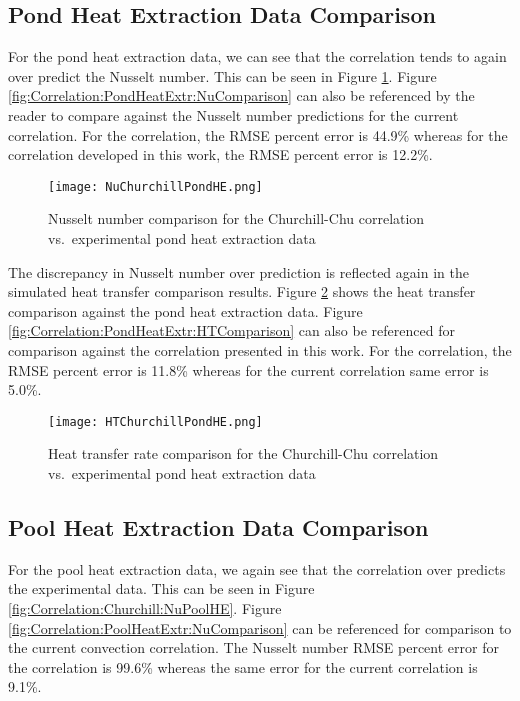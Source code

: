 \subsection{Pond Heat Extraction Data Comparison}
\label{Correlation:Churchill:PondHE}

For the pond heat extraction data, we can see that the \cite{ChurchillChu1975} correlation tends to again over predict the Nusselt number. This can be seen in Figure \ref{fig:Correlation:Churchill:NuPondHE}. Figure \ref{fig:Correlation:PondHeatExtr:NuComparison} can also be referenced by the reader to compare against the Nusselt number predictions for the current correlation. For the \cite{ChurchillChu1975} correlation, the RMSE percent error is 44.9\% whereas for the correlation developed in this work, the RMSE percent error is 12.2\%.

\begin{figure}
	\centering
	\texttt{[image: NuChurchillPondHE.png]}
	\caption{Nusselt number comparison for the Churchill-Chu correlation vs.\ experimental pond heat extraction data}
	\label{fig:Correlation:Churchill:NuPondHE}
\end{figure}

The discrepancy in Nusselt number over prediction is reflected again in the simulated heat transfer comparison results. Figure \ref{fig:Correlation:Churchill:HTPondHE} shows the heat transfer comparison against the pond heat extraction data. Figure \ref{fig:Correlation:PondHeatExtr:HTComparison} can also be referenced for comparison against the correlation presented in this work. For the \cite{ChurchillChu1975} correlation, the RMSE percent error is 11.8\% whereas for the current correlation same error is 5.0\%.

\begin{figure}
	\centering
	\texttt{[image: HTChurchillPondHE.png]}
	\caption{Heat transfer rate comparison for the Churchill-Chu correlation vs.\ experimental pond heat extraction data}
	\label{fig:Correlation:Churchill:HTPondHE}
\end{figure}

\subsection{Pool Heat Extraction Data Comparison}
\label{Correlation:Churchill:PoolHE}

For the pool heat extraction data, we again see that the \cite{ChurchillChu1975} correlation over predicts the experimental data. This can be seen in Figure \ref{fig:Correlation:Churchill:NuPoolHE}. Figure \ref{fig:Correlation:PoolHeatExtr:NuComparison} can be referenced for comparison to the current convection correlation. The Nusselt number RMSE percent error for the \cite{ChurchillChu1975} correlation  is 99.6\% whereas the same error for the current correlation is 9.1\%.

